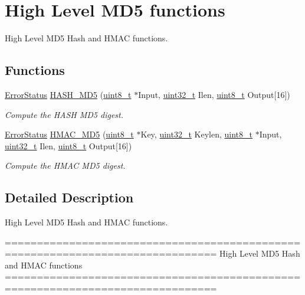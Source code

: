 \hypertarget{group___h_a_s_h___group7}{\section{High Level M\-D5 functions}
\label{group___h_a_s_h___group7}
}


High Level M\-D5 Hash and H\-M\-A\-C functions.  


\subsection*{Functions}
\begin{DoxyCompactItemize}
\item 
\hyperlink{group___exported__types_ga8333b96c67f83cba354b3407fcbb6ee8}{Error\-Status} \hyperlink{group___h_a_s_h___group7_ga82a155884e458cc6b7c1a4565c1ac8e9}{H\-A\-S\-H\-\_\-\-M\-D5} (\hyperlink{stdint_8h_aba7bc1797add20fe3efdf37ced1182c5}{uint8\-\_\-t} $\ast$Input, \hyperlink{stdint_8h_a435d1572bf3f880d55459d9805097f62}{uint32\-\_\-t} Ilen, \hyperlink{stdint_8h_aba7bc1797add20fe3efdf37ced1182c5}{uint8\-\_\-t} Output\mbox{[}16\mbox{]})
\begin{DoxyCompactList}\small\item\em Compute the H\-A\-S\-H M\-D5 digest. \end{DoxyCompactList}\item 
\hyperlink{group___exported__types_ga8333b96c67f83cba354b3407fcbb6ee8}{Error\-Status} \hyperlink{group___h_a_s_h___group7_gac61733e7aa66bdd2f21be4b34165b5be}{H\-M\-A\-C\-\_\-\-M\-D5} (\hyperlink{stdint_8h_aba7bc1797add20fe3efdf37ced1182c5}{uint8\-\_\-t} $\ast$Key, \hyperlink{stdint_8h_a435d1572bf3f880d55459d9805097f62}{uint32\-\_\-t} Keylen, \hyperlink{stdint_8h_aba7bc1797add20fe3efdf37ced1182c5}{uint8\-\_\-t} $\ast$Input, \hyperlink{stdint_8h_a435d1572bf3f880d55459d9805097f62}{uint32\-\_\-t} Ilen, \hyperlink{stdint_8h_aba7bc1797add20fe3efdf37ced1182c5}{uint8\-\_\-t} Output\mbox{[}16\mbox{]})
\begin{DoxyCompactList}\small\item\em Compute the H\-M\-A\-C M\-D5 digest. \end{DoxyCompactList}\end{DoxyCompactItemize}


\subsection{Detailed Description}
High Level M\-D5 Hash and H\-M\-A\-C functions. \begin{DoxyVerb} ===============================================================================
                          High Level MD5 Hash and HMAC functions
 ===============================================================================\end{DoxyVerb}
 

